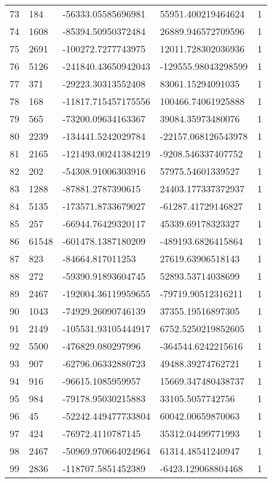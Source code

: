 \begin{longtable}{lllll}
    73 & 184 & -56333.05585696981 & 55951.400219464624 & 1 \\
    74 & 1608 & -85394.50950372484 & 26889.946572709596 & 1 \\
    75 & 2691 & -100272.7277743975 & 12011.728302036936 & 1 \\
    76 & 5126 & -241840.43650942043 & -129555.98043298599 & 1 \\
    77 & 371 & -29223.30313552408 & 83061.15294091035 & 1 \\
    78 & 168 & -11817.715457175556 & 100466.74061925888 & 1 \\
    79 & 565 & -73200.09634163367 & 39084.35973480076 & 1 \\
    80 & 2239 & -134441.5242029784 & -22157.068126543978 & 1 \\
    81 & 2165 & -121493.00241384219 & -9208.546337407752 & 1 \\
    82 & 202 & -54308.91006303916 & 57975.54601339527 & 1 \\
    83 & 1288 & -87881.2787390615 & 24403.177337372937 & 1 \\
    84 & 5135 & -173571.8733679027 & -61287.41729146827 & 1 \\
    85 & 257 & -66944.76429320117 & 45339.69178323327 & 1 \\
    86 & 61548 & -601478.1387180209 & -489193.6826415864 & 1 \\
    87 & 823 & -84664.817011253 & 27619.63906518143 & 1 \\
    88 & 272 & -59390.91893604745 & 52893.53714038699 & 1 \\
    89 & 2467 & -192004.36119959655 & -79719.90512316211 & 1 \\
    90 & 1043 & -74929.26090746139 & 37355.19516897305 & 1 \\
    91 & 2149 & -105531.93105444917 & 6752.5250219852605 & 1 \\
    92 & 5500 & -476829.080297996 & -364544.6242215616 & 1 \\
    93 & 907 & -62796.06332880723 & 49488.39274762721 & 1 \\
    94 & 916 & -96615.1085959957 & 15669.347480438737 & 1 \\
    95 & 984 & -79178.95030215883 & 33105.5057742756 & 1 \\
    96 & 45 & -52242.449477733804 & 60042.00659870063 & 1 \\
    97 & 424 & -76972.4110787145 & 35312.04499771993 & 1 \\
    98 & 2467 & -50969.970664024964 & 61314.48541240947 & 1 \\
    99 & 2836 & -118707.5851452389 & -6423.129068804468 & 1
\end{longtable}